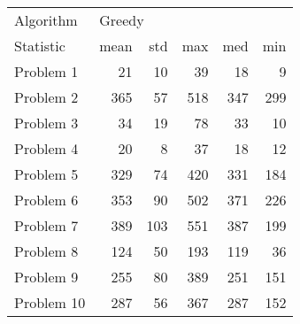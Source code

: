 \begin{tabular}{lrrrrr}
\toprule
Algorithm & \multicolumn{5}{l}{Greedy} \\
Statistic &   mean &  std &  max &  med &  min \\
\midrule
Problem 1  &     21 &   10 &   39 &   18 &    9 \\
Problem 2  &    365 &   57 &  518 &  347 &  299 \\
Problem 3  &     34 &   19 &   78 &   33 &   10 \\
Problem 4  &     20 &    8 &   37 &   18 &   12 \\
Problem 5  &    329 &   74 &  420 &  331 &  184 \\
Problem 6  &    353 &   90 &  502 &  371 &  226 \\
Problem 7  &    389 &  103 &  551 &  387 &  199 \\
Problem 8  &    124 &   50 &  193 &  119 &   36 \\
Problem 9  &    255 &   80 &  389 &  251 &  151 \\
Problem 10 &    287 &   56 &  367 &  287 &  152 \\
\bottomrule
\end{tabular}
